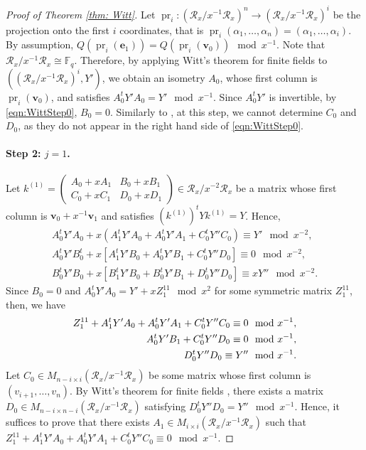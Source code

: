 \documentclass[11pt,a4paper,reqno]{amsart}
\theoremstyle{definition}
\theoremstyle{remark}
\numberwithin{equation}{section}
\begin{document}
\begin{proof}[Proof of Theorem \ref{thm: Witt}]
    Let $\operatorname{pr}_i:(\mathcal{R}_x/x^{-1}\mathcal{R}_x)^n\rightarrow (\mathcal{R}_x/x^{-1}\mathcal{R}_x)^i$ be the projection onto the first $i$ coordinates, that is $\operatorname{pr}_i(\alpha_1,\dots,\alpha_n)=(\alpha_1,\dots,\alpha_i)$. By assumption, $Q(\operatorname{pr}_i(\mathbf{e}_1))=Q(\operatorname{pr}_i(\mathbf{v}_0))\mod x^{-1}$. Note that $\mathcal{R}_x/x^{-1}\mathcal{R}_x\cong \mathbb{F}_q$. Therefore, by applying Witt's theorem for finite fields \cite[page 121]{Art} to $\left((\mathcal{R}_x/x^{-1}\mathcal{R}_x)^i,Y'\right)$, we obtain an isometry $A_0$, whose first column is $\operatorname{pr}_i(\mathbf{v}_0)$, and satisfies $A_0^tY'A_0=Y'\mod x^{-1}$. Since $A_0^tY'$ is invertible, by \eqref{eqn:WittStep0}, $B_0=0$. Similarly to \cite[Proposition A.1]{HLM}, at this step, we cannot determine $C_0$ and $D_0$, as they do not appear in the right hand side of \eqref{eqn:WittStep0}. 
    \paragraph{\textbf{Step 2: $j=1$.}} Let $k^{(1)}=\begin{pmatrix}
        A_0+xA_1&B_0+xB_1\\
        C_0+xC_1&D_0+xD_1
    \end{pmatrix} \in \mathcal{R}_x/x^{-2}\mathcal{R}_x$ be a matrix whose first column is $\mathbf{v}_0+x^{-1}\mathbf{v}_1$ and satisfies $(k^{(1)})^tYk^{(1)}=Y$. Hence, 
    \begin{equation}
    \begin{split}
        A_0^tY'A_0+x(A_1^tY'A_0+A_0^tY'A_1+C_0^tY''C_0)\equiv Y'\mod x^{-2},\\
        A_0^tY'B_0^t+x\left[A_1^tY'B_0+A_0^tY'B_1+C_0^tY''D_0\right]\equiv 0\mod x^{-2},\\
        B_0^tY'B_0+x\left[B_1^tY'B_0+B_0^tY'B_1+D_0^tY''D_0\right]\equiv xY''\mod x^{-2}.
    \end{split}
    \end{equation}
    Since $B_0=0$ and $A_0^tY'A_0=Y'+xZ_1^{11}\mod x^2$ for some symmetric matrix $Z_1^{11}$, then, we have
    \begin{equation}
    \begin{split}
    \label{eqn:x^{-1}CONDS}
        Z_1^{11}+A_1^tY'A_0+A_0^tY'A_1+C_0^tY''C_0\equiv 0 \mod x^{-1},\\
        A_0^tY'B_1+C_0^tY''D_0\equiv 0 \mod x^{-1},\\
        D_0^tY''D_0\equiv Y''\mod x^{-1}.
    \end{split}
    \end{equation}
    Let $C_0\in M_{n-i\times i}(\mathcal{R}_x/x^{-1}\mathcal{R}_x)$ be some matrix whose first column is $(v_{i+1},\dots,v_n)$. By Witt's theorem for finite fields \cite[page 121]{Art}, there exists a matrix $D_0\in M_{n-i\times n-i}(\mathcal{R}_x/x^{-1}\mathcal{R}_x)$ satisfying $D_0^tY''D_0=Y''\mod x^{-1}$. Hence, it suffices to prove that there exists $A_1\in M_{i\times i}(\mathcal{R}_x/x^{-1}\mathcal{R}_x)$ such that $Z_1^{11}+A_1^tY'A_0+A_0^tY'A_1+C_0^tY''C_0\equiv 0\mod x^{-1}$. 

\end{proof}
\end{document}
